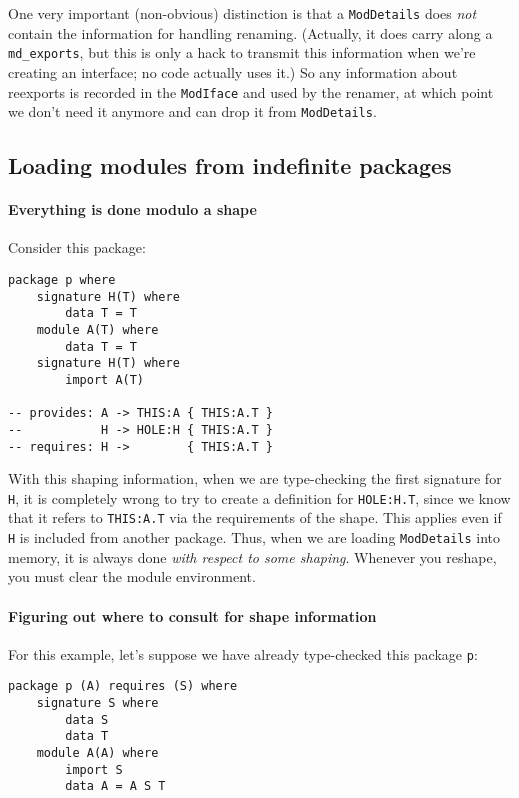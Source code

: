 \documentclass{article}
\begin{document}
One very important (non-obvious) distinction is that a \verb|ModDetails|
does \emph{not} contain the information for handling renaming.
(Actually, it does carry along a \verb|md_exports|, but this is only a
hack to transmit this information when we're creating an interface;
no code actually uses it.)  So any information about reexports is
recorded in the \verb|ModIface| and used by the renamer, at which point
we don't need it anymore and can drop it from \verb|ModDetails|.

\subsection{Loading modules from indefinite packages}

\paragraph{Everything is done modulo a shape}  Consider
this package:

\begin{verbatim}
package p where
    signature H(T) where
        data T = T
    module A(T) where
        data T = T
    signature H(T) where
        import A(T)

-- provides: A -> THIS:A { THIS:A.T }
--           H -> HOLE:H { THIS:A.T }
-- requires: H ->        { THIS:A.T }
\end{verbatim}

With this shaping information, when we are type-checking the first
signature for \verb|H|, it is completely wrong to try to create
a definition for \verb|HOLE:H.T|, since we know that it refers
to \verb|THIS:A.T| via the requirements of the shape.  This applies
even if \verb|H| is included from another package.  Thus, when
we are loading \verb|ModDetails| into memory, it is always done
\emph{with respect to some shaping}.  Whenever you reshape,
you must clear the module environment.

\paragraph{Figuring out where to consult for shape information}

For this example, let's suppose we have already type-checked
this package \verb|p|:

\begin{verbatim}
package p (A) requires (S) where
    signature S where
        data S
        data T
    module A(A) where
        import S
        data A = A S T
\end{verbatim}
\end{document}
